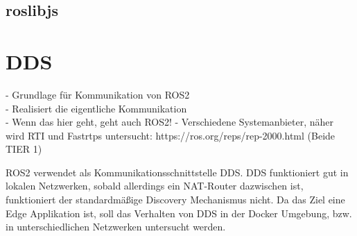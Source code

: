 		\subsection{roslibjs}
		\label{Grundlagen:ROS2:RosLibJS}
	
	\section{DDS}
	\label{Grundlagen:DDS}
		- Grundlage für Kommunikation von ROS2\\
		- Realisiert die eigentliche Kommunikation\\
		- Wenn das hier geht, geht auch ROS2!
		- Verschiedene Systemanbieter, näher wird RTI und Fastrtps untersucht: https://ros.org/reps/rep-2000.html  (Beide TIER 1)
		
		ROS2 verwendet als Kommunikationsschnittstelle DDS.
		DDS funktioniert gut in lokalen Netzwerken, sobald allerdings ein NAT-Router dazwischen ist, funktioniert der standardmäßige Discovery Mechanismus nicht.
		Da das Ziel eine Edge Applikation ist, soll das Verhalten von DDS in der Docker Umgebung, bzw. in unterschiedlichen Netzwerken untersucht werden.
	
		
		
